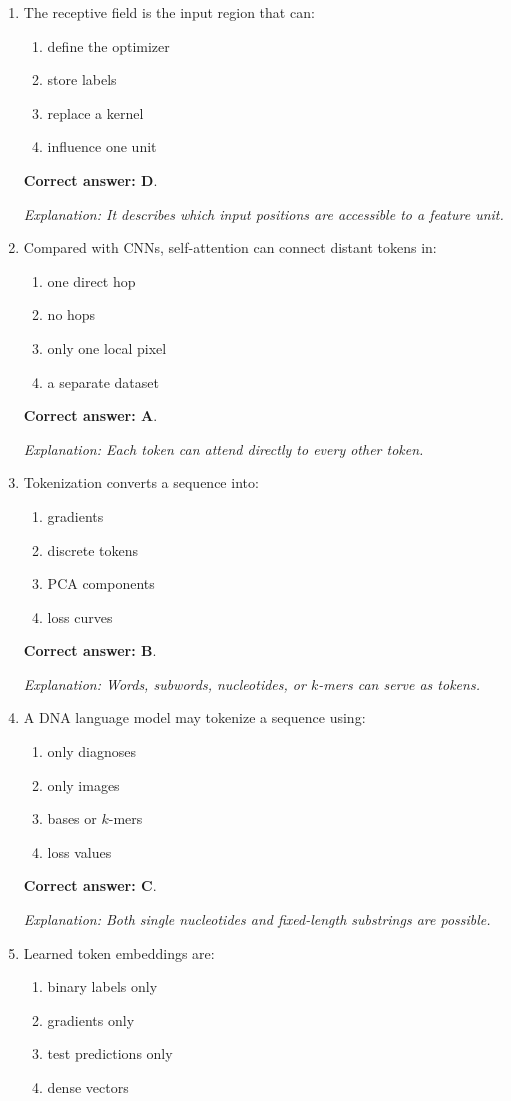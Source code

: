 \documentclass[10pt,a4paper]{article}
\newcommand{\ans}[1]{\par\textbf{Correct answer: #1}}
\newcommand{\expn}[1]{\par\textit{Explanation: #1}}
\begin{document}
\begin{enumerate}[label=\textbf{\arabic*.},itemsep=4pt]
\ans{C}. \expn{Deeper layers combine simple local features into shapes and morphology.}
\item The receptive field is the input region that can:
\begin{enumerate}[label=\Alph*.,itemsep=0pt]\item define the optimizer\item store labels\item replace a kernel\item influence one unit\end{enumerate}
\ans{D}. \expn{It describes which input positions are accessible to a feature unit.}
\item Compared with CNNs, self-attention can connect distant tokens in:
\begin{enumerate}[label=\Alph*.,itemsep=0pt]\item one direct hop\item no hops\item only one local pixel\item a separate dataset\end{enumerate}
\ans{A}. \expn{Each token can attend directly to every other token.}
\item Tokenization converts a sequence into:
\begin{enumerate}[label=\Alph*.,itemsep=0pt]\item gradients\item discrete tokens\item PCA components\item loss curves\end{enumerate}
\ans{B}. \expn{Words, subwords, nucleotides, or $k$-mers can serve as tokens.}
\item A DNA language model may tokenize a sequence using:
\begin{enumerate}[label=\Alph*.,itemsep=0pt]\item only diagnoses\item only images\item bases or $k$-mers\item loss values\end{enumerate}
\ans{C}. \expn{Both single nucleotides and fixed-length substrings are possible.}
\item Learned token embeddings are:
\begin{enumerate}[label=\Alph*.,itemsep=0pt]\item binary labels only\item gradients only\item test predictions only\item dense vectors\end{enumerate}

\end{enumerate}
\end{document}
